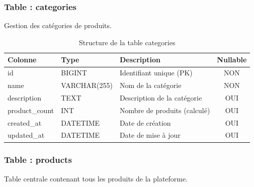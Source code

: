 \documentclass[12pt,a4paper]{report}
\begin{document}
\subsubsection{Table : categories}

Gestion des catégories de produits.

\begin{table}[H]
    \centering
    \caption{Structure de la table categories}
    \begin{tabularx}{\textwidth}{llXc}
        \toprule
        \textbf{Colonne} & \textbf{Type} & \textbf{Description} & \textbf{Nullable} \\
        \midrule
        id & BIGINT & Identifiant unique (PK) & NON \\
        name & VARCHAR(255) & Nom de la catégorie & NON \\
        description & TEXT & Description de la catégorie & OUI \\
        product\_count & INT & Nombre de produits (calculé) & OUI \\
        created\_at & DATETIME & Date de création & OUI \\
        updated\_at & DATETIME & Date de mise à jour & OUI \\
        \bottomrule
    \end{tabularx}
    \label{tab:categories}
\end{table}

\subsubsection{Table : products}

Table centrale contenant tous les produits de la plateforme.
\end{document}
